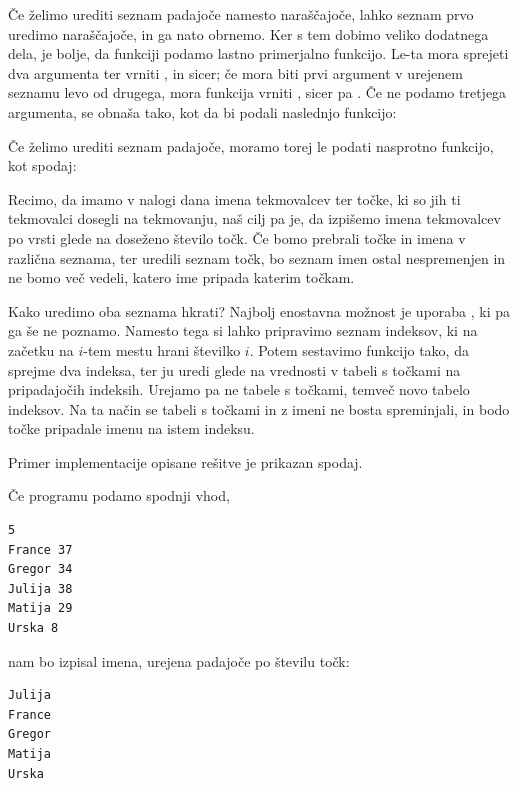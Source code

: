 
Če želimo urediti seznam padajoče namesto naraščajoče, lahko seznam prvo uredimo
naraščajoče, in ga nato obrnemo.
Ker s tem dobimo veliko dodatnega dela, je bolje, da funkciji  podamo
lastno primerjalno funkcijo.
Le-ta mora sprejeti dva argumenta ter vrniti , in sicer; če mora biti
prvi argument v urejenem seznamu levo od drugega, mora funkcija vrniti ,
sicer pa .
Če ne podamo tretjega argumenta, se  obnaša tako, kot da bi podali
naslednjo funkcijo:


Če želimo urediti seznam padajoče, moramo torej le podati nasprotno funkcijo,
kot spodaj:



Recimo, da imamo v nalogi dana imena tekmovalcev ter točke, ki so jih ti
tekmovalci dosegli na tekmovanju, naš cilj pa je, da izpišemo imena tekmovalcev
po vrsti glede na doseženo število točk.
Če bomo prebrali točke in imena v različna seznama, ter uredili seznam točk, bo
seznam imen ostal nespremenjen in ne bomo več vedeli, katero ime pripada katerim
točkam.

Kako uredimo oba seznama hkrati?
Najbolj enostavna možnost je uporaba , ki pa ga še ne poznamo.
Namesto tega si lahko pripravimo seznam indeksov, ki na začetku na $i$-tem mestu
hrani številko $i$.
Potem sestavimo funkcijo  tako, da sprejme dva indeksa, ter ju uredi
glede na vrednosti v tabeli s točkami na pripadajočih indeksih.
Urejamo pa ne tabele s točkami, temveč novo tabelo indeksov.
Na ta način se tabeli s točkami in z imeni ne bosta spreminjali, in bodo točke
pripadale imenu na istem indeksu.

Primer implementacije opisane rešitve je prikazan spodaj.


\noindent
Če programu podamo spodnji vhod,
\begin{verbatim}
5
France 37
Gregor 34
Julija 38
Matija 29
Urska 8
\end{verbatim}
nam bo izpisal imena, urejena padajoče po številu točk:
\begin{verbatim}
Julija
France
Gregor
Matija
Urska
\end{verbatim}